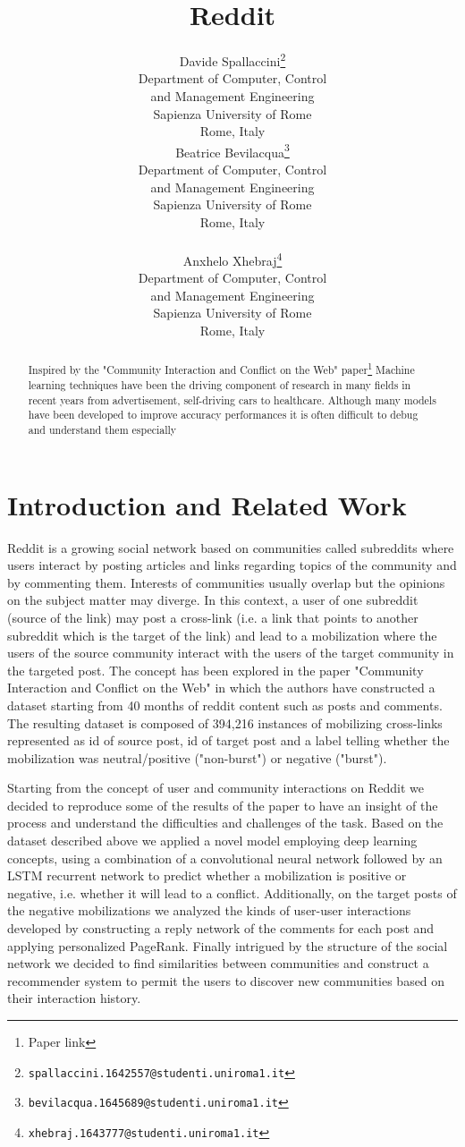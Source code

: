 \documentclass{article}
\title{Reddit}
\author{
  Davide Spallaccini\thanks{\texttt{spallaccini.1642557@studenti.uniroma1.it}} \\
  Department of Computer, Control \\ and Management Engineering\\
  Sapienza University of Rome\\
  Rome, Italy \\
  \And
  Beatrice Bevilacqua\thanks{\texttt{bevilacqua.1645689@studenti.uniroma1.it}} \\
  Department of Computer, Control \\ and Management Engineering\\
  Sapienza University of Rome\\
  Rome, Italy \\
   \\
  \And
  Anxhelo Xhebraj\thanks{\texttt{xhebraj.1643777@studenti.uniroma1.it}} \\
  Department of Computer, Control \\ and Management Engineering\\
  Sapienza University of Rome\\
  Rome, Italy
}
\begin{document}

\maketitle

\begin{abstract}

  Inspired by the "Community Interaction and Conflict on the Web"
  paper\footnote{Paper link}
  Machine learning techniques have been the driving component of research in
  many fields in recent years from advertisement, self-driving cars to
  healthcare. Although many models have been developed to improve accuracy
  performances it is often difficult to debug and understand them especially
\end{abstract}

\section{Introduction and Related Work}
\label{sec:intro}

Reddit is a growing social network based on communities called
subreddits where users interact by posting articles and links regarding
topics of the community and by commenting them. Interests of communities usually
overlap but the
opinions on the subject matter may diverge. In this context, a user of one
subreddit (source of the link) may post a cross-link (i.e. a link that
points to another subreddit which is the target of the link) and lead to
a mobilization where the users of the source community interact with the users
of the target community in the targeted post. The concept has been explored in
the paper "Community Interaction and Conflict on the Web" in which the authors
have constructed a dataset starting from 40 months of reddit content such as
posts and comments. The resulting dataset is composed of 394,216 instances of
mobilizing cross-links represented as id of source post, id of target post
and a label telling whether the mobilization was neutral/positive ("non-burst")
or negative ("burst").

Starting from the concept of user and community interactions on Reddit we
decided to reproduce some of the results of the paper to have an insight of the
process and understand the difficulties and challenges of the task. Based on the
dataset described above we applied a novel model employing deep learning
concepts,
using a combination of a convolutional neural network followed by an LSTM
recurrent network to predict whether a mobilization is positive or negative,
i.e. whether it will lead to a conflict. Additionally, on the target posts of
the negative mobilizations we analyzed the kinds of user-user interactions
developed by constructing a reply network of the comments for each post and 
applying personalized PageRank. Finally intrigued by the structure of the social
network we decided to find similarities between communities and construct a
recommender system to permit the users to discover new communities based on
their interaction history.
\end{document}
